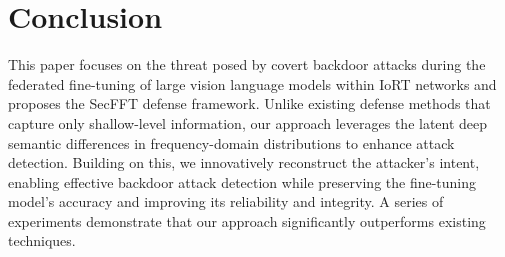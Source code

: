 \documentclass[lettersize,journal]{IEEEtran}
\begin{document}

\section{Conclusion}
This paper focuses on the threat posed by covert backdoor attacks during the federated fine-tuning of large vision language models within IoRT networks and proposes the SecFFT defense framework. Unlike existing defense methods that capture only shallow-level information, our approach leverages the latent deep semantic differences in frequency-domain distributions to enhance attack detection. Building on this, we innovatively reconstruct the attacker’s intent, enabling effective backdoor attack detection while preserving the fine-tuning model's accuracy and improving its reliability and integrity. 
A series of experiments demonstrate that our approach significantly outperforms existing techniques. %
\end{document}

